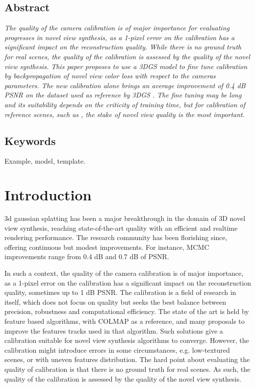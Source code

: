 \documentclass[a4paper,twoside,french]{article}
\begin{document}
\subsection*{Abstract}
{\em
The quality of the camera calibration is of major importance for evaluating progresses in novel view synthesis,
as a 1-pixel error on the calibration has a significant impact on the reconstruction quality.
While there is no ground truth for real scenes, the quality of the calibration is assessed by the quality of the novel view synthesis.
This paper proposes to use a 3DGS \cite{kerbl20233d} model to fine tune calibration by backpropagation of novel view color loss with
respect to the cameras parameters. The new calibration alone brings an average improvement of 0.4 dB PSNR on the dataset used as reference by 3DGS \cite{kerbl20233d}.
The fine tuning may be long and its suitability depends on the criticity of training time, but for calibration
of reference scenes, such as \cite{barron2022mip}, the stake of novel view quality is the most important.
}
\subsection*{Keywords}
Example, model, template.

\section{Introduction}
3d gaussian splatting \cite{kerbl20233d} has been a major breakthrough in the domain of 3D novel view synthesis, reaching state-of-the-art quality with an
efficient and realtime rendering performance. The research community has been florishing since, offering continuous but modest improvements.
For instance, MCMC \cite{kheradmand20243d} improvements range from 0.4 dB and 0.7 dB of PSNR.

In such a context, the quality of the camera calibration is of major importance, as a 1-pixel error on the calibration has a significant
impact on the reconstruction quality, sometimes up to 1 dB PSNR. The calibration is a field of research in itself, which does not focus on quality but seeks 
the best balance between precision, robustness and computational efficiency. The state of the art is held by feature based algorithms,
with COLMAP \cite{schonberger2018robust} as a reference, and many proposals to improve the features tracks used in that algorithm.
Such solutions give a calibration suitable for novel view synthesis algorithms to converge. However, the calibration might introduce errors
in some circumstances, e.g. low-textured scenes, or with uneven features distribution. 
The hard point about evaluating the quality of calibration is that there is no ground truth for real scenes. As such, the quality of the 
calibration is assessed by the quality of the novel view synthesis.
\end{document}
